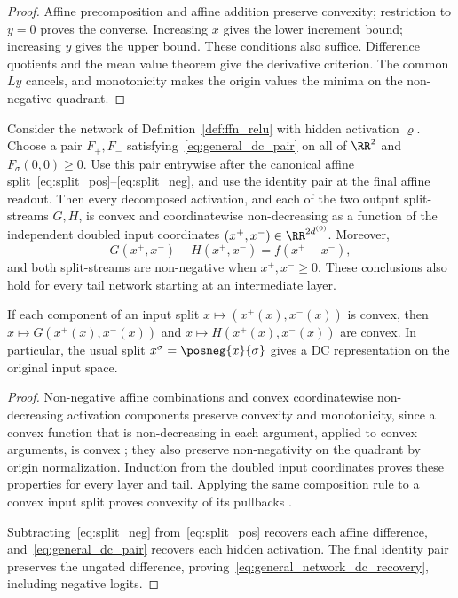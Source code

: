 \begin{proof}
Affine precomposition and affine addition preserve convexity; restriction to $y=0$ proves the converse. Increasing $x$ gives the lower increment bound; increasing $y$ gives the upper bound. These conditions also suffice. Difference quotients and the mean value theorem give the derivative criterion. The common $Ly$ cancels, and monotonicity makes the origin values the minima on the non-negative quadrant.
\end{proof}

\begin{theoremenv}\label{thm:general_dc_network}
Consider the network of Definition~\ref{def:ffn_relu} with hidden activation $\varrho$. Choose a pair $F_+,F_-$ satisfying~\eqref{eq:general_dc_pair} on all of $\RR^2$ and $F_\sigma(0,0)\ge0$. Use this pair entrywise after the canonical affine split~\eqref{eq:split_pos}--\eqref{eq:split_neg}, and use the identity pair at the final affine readout. Then every decomposed activation, and each of the two output split-streams $G,H$, is convex and coordinatewise non-decreasing as a function of the independent doubled input coordinates $(x^+,x^-)\in\RR^{2d^{(0)}}$. Moreover,
\begin{equation}
    G(x^+,x^-)-H(x^+,x^-)=f(x^+-x^-),
    \label{eq:general_network_dc_recovery}
\end{equation}
and both split-streams are non-negative when $x^+,x^-\ge0$. These conclusions also hold for every tail network starting at an intermediate layer.

If each component of an input split $x\mapsto(x^+(x),x^-(x))$ is convex, then $x\mapsto G(x^+(x),x^-(x))$ and $x\mapsto H(x^+(x),x^-(x))$ are convex. In particular, the usual split $x^\sigma=\posneg{x}{\sigma}$ gives a DC representation on the original input space.
\end{theoremenv}

\begin{proof}
Non-negative affine combinations and convex coordinatewise non-decreasing activation components preserve convexity and monotonicity, since a convex function that is non-decreasing in each argument, applied to convex arguments, is convex \parencite[Section~3.2.4]{BoydVandenberghe2004}; they also preserve non-negativity on the quadrant by origin normalization. Induction from the doubled input coordinates proves these properties for every layer and tail. Applying the same composition rule to a convex input split proves convexity of its pullbacks \parencite{Amos2017}.

Subtracting~\eqref{eq:split_neg} from~\eqref{eq:split_pos} recovers each affine difference, and~\eqref{eq:general_dc_pair} recovers each hidden activation. The final identity pair preserves the ungated difference, proving~\eqref{eq:general_network_dc_recovery}, including negative logits.
\end{proof}

